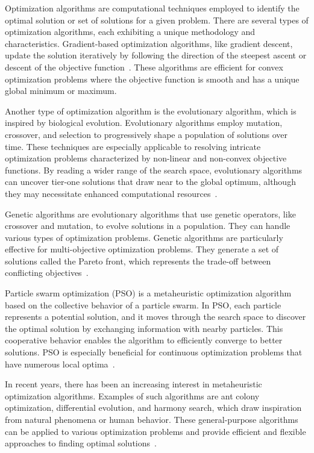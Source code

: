 Optimization algorithms are computational techniques employed to identify the optimal solution or set of solutions for a given problem. There are several types of optimization algorithms, each exhibiting a unique methodology and characteristics. Gradient-based optimization algorithms, like gradient descent, update the solution iteratively by following the direction of the steepest ascent or descent of the objective function~\cite{Ruder.2017}. These algorithms are efficient for convex optimization problems where the objective function is smooth and has a unique global minimum or maximum.

Another type of optimization algorithm is the evolutionary algorithm, which is inspired by biological evolution. Evolutionary algorithms employ mutation, crossover, and selection to progressively shape a population of solutions over time. These techniques are especially applicable to resolving intricate optimization problems characterized by non-linear and non-convex objective functions. By reading a wider range of the search space, evolutionary algorithms can uncover tier-one solutions that draw near to the global optimum, although they may necessitate enhanced computational resources~\cite{Back.1993}.

Genetic algorithms are evolutionary algorithms that use genetic operators, like crossover and mutation, to evolve solutions in a population. They can handle various types of optimization problems. Genetic algorithms are particularly effective for multi-objective optimization problems. They generate a set of solutions called the Pareto front, which represents the trade-off between conflicting objectives~\cite{Lambora.2019,Katoch.2021}.

Particle swarm optimization (PSO) is a metaheuristic optimization algorithm based on the collective behavior of a particle swarm. In PSO, each particle represents a potential solution, and it moves through the search space to discover the optimal solution by exchanging information with nearby particles. This cooperative behavior enables the algorithm to efficiently converge to better solutions. PSO is especially beneficial for continuous optimization problems that have numerous local optima~\cite{Back.1993}.

In recent years, there has been an increasing interest in metaheuristic optimization algorithms. Examples of such algorithms are ant colony optimization, differential evolution, and harmony search, which draw inspiration from natural phenomena or human behavior. These general-purpose algorithms can be applied to various optimization problems and provide efficient and flexible approaches to finding optimal solutions~\cite{Yang.2011}.

